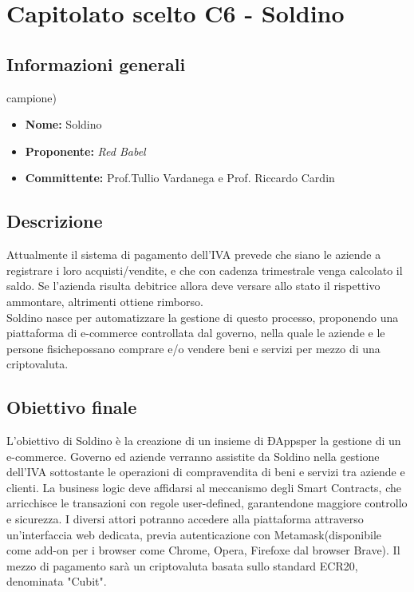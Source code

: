 \section{Capitolato scelto C6 - Soldino}
\subsection{Informazioni generali}
campione)
% 
\begin{itemize}
\item
\textbf{Nome:} Soldino
\item
\textbf{Proponente:} \textit{Red Babel} 
\item
\textbf{Committente:} Prof.Tullio Vardanega e Prof. Riccardo Cardin
\end{itemize}
\subsection{Descrizione}
Attualmente il sistema di pagamento dell'IVA prevede che siano le aziende a 
registrare i loro acquisti/vendite, e che con cadenza trimestrale venga 
calcolato il saldo. Se l'azienda risulta debitrice allora deve versare allo 
stato il rispettivo ammontare, altrimenti ottiene rimborso.
 \\Soldino nasce per automatizzare la gestione di 
questo processo, proponendo una piattaforma di e-commerce controllata dal 
governo, nella quale le aziende e le persone fisiche\glosp possano comprare e/o vendere beni 
e servizi per mezzo di una criptovaluta.

\subsection{Obiettivo finale}
L'obiettivo di Soldino è la creazione di un insieme di ÐApps\glosp per la 
gestione di un e-commerce. Governo ed aziende verranno assistite da Soldino 
nella gestione dell'IVA sottostante le operazioni di compravendita di beni e 
servizi tra aziende e clienti. La business logic deve affidarsi al meccanismo 
degli Smart Contracts\glo, che arricchisce le transazioni con regole 
user-defined, garantendone maggiore controllo e sicurezza. I diversi attori 
potranno accedere alla piattaforma attraverso un'interfaccia web dedicata, 
previa autenticazione con Metamask\glosp (disponibile come add-on per i browser 
come Chrome\glo, Opera\glo, Firefox\glo e dal browser Brave\glo).  Il 
mezzo di pagamento sarà un criptovaluta basata sullo standard ECR20\glo , 
denominata "Cubit"\glo.

